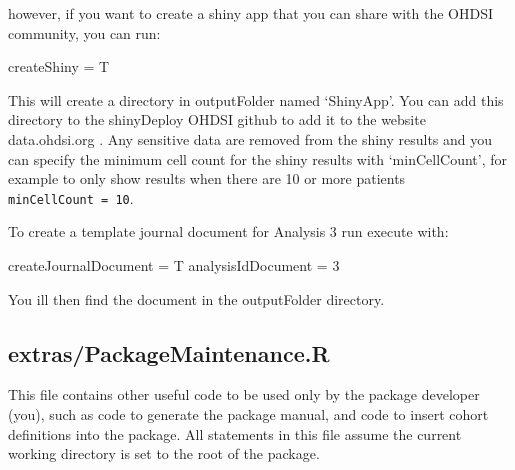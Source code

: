\documentclass[]{article}
\newenvironment{Shaded}{\begin{snugshade}}{\end{snugshade}}
\newcommand{\DecValTok}[1]{\textcolor[rgb]{0.00,0.00,0.81}{#1}}
\newcommand{\StringTok}[1]{\textcolor[rgb]{0.31,0.60,0.02}{#1}}
\newcommand{\NormalTok}[1]{#1}
\begin{document}
however, if you want to create a shiny app that you can share with the
OHDSI community, you can run:

\begin{Shaded}
\begin{Highlighting}[]
\NormalTok{    createShiny =}\StringTok{ }\NormalTok{T  }
\end{Highlighting}
\end{Shaded}

This will create a directory in outputFolder named `ShinyApp'. You can
add this directory to the shinyDeploy OHDSI github to add it to the
website data.ohdsi.org . Any sensitive data are removed from the shiny
results and you can specify the minimum cell count for the shiny results
with `minCellCount', for example to only show results when there are 10
or more patients \texttt{minCellCount\ =\ 10}.

To create a template journal document for Analysis 3 run execute with:

\begin{Shaded}
\begin{Highlighting}[]
\NormalTok{    createJournalDocument =}\StringTok{ }\NormalTok{T}
\NormalTok{    analysisIdDocument =}\StringTok{ }\DecValTok{3}
\end{Highlighting}
\end{Shaded}

You ill then find the document in the outputFolder directory.

\subsection{extras/PackageMaintenance.R}\label{extraspackagemaintenance.r}

This file contains other useful code to be used only by the package
developer (you), such as code to generate the package manual, and code
to insert cohort definitions into the package. All statements in this
file assume the current working directory is set to the root of the
package.
\end{document}
